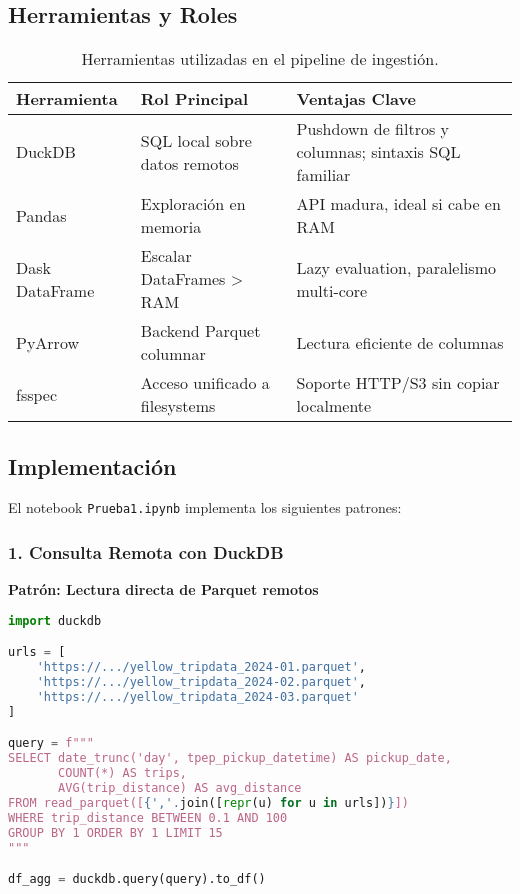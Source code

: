 \documentclass[12pt]{src/formato_utem}
\begin{document}
\subsection{Herramientas y Roles}

\begin{table}[h!]
\centering
\begin{tabular}{|l|p{5cm}|p{5cm}|}
\hline
\textbf{Herramienta} & \textbf{Rol Principal} & \textbf{Ventajas Clave} \\ \hline
DuckDB & SQL local sobre datos remotos & Pushdown de filtros y columnas; sintaxis SQL familiar \\ \hline
Pandas & Exploración en memoria & API madura, ideal si cabe en RAM \\ \hline
Dask DataFrame & Escalar DataFrames > RAM & Lazy evaluation, paralelismo multi-core \\ \hline
PyArrow & Backend Parquet columnar & Lectura eficiente de columnas \\ \hline
fsspec & Acceso unificado a filesystems & Soporte HTTP/S3 sin copiar localmente \\ \hline
\end{tabular}
\caption{Herramientas utilizadas en el pipeline de ingestión.}
\label{tab:pipeline-tools}
\end{table}

\subsection{Implementación}

El notebook \texttt{Prueba1.ipynb} implementa los siguientes patrones:

\subsubsection{1. Consulta Remota con DuckDB}

\textbf{Patrón: Lectura directa de Parquet remotos}

\begin{lstlisting}[language=Python]
import duckdb

urls = [
    'https://.../yellow_tripdata_2024-01.parquet',
    'https://.../yellow_tripdata_2024-02.parquet',
    'https://.../yellow_tripdata_2024-03.parquet'
]

query = f"""
SELECT date_trunc('day', tpep_pickup_datetime) AS pickup_date,
       COUNT(*) AS trips,
       AVG(trip_distance) AS avg_distance
FROM read_parquet([{','.join([repr(u) for u in urls])}])
WHERE trip_distance BETWEEN 0.1 AND 100
GROUP BY 1 ORDER BY 1 LIMIT 15
"""

df_agg = duckdb.query(query).to_df()
\end{lstlisting}
\end{document}
